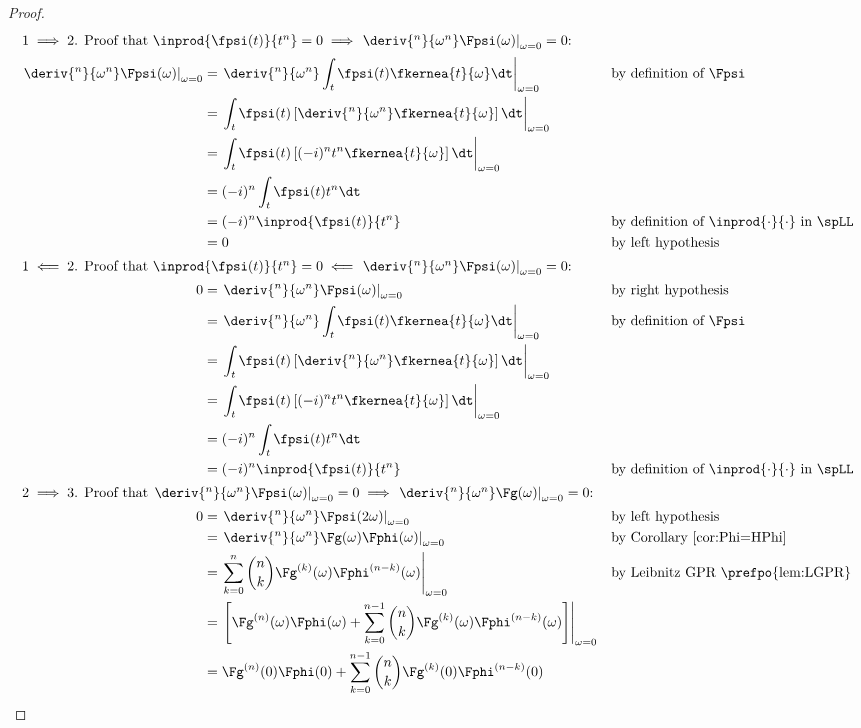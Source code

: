 \begin{proof}
\begin{align*}
  \intertext{$1\implies2$. Proof that $\inprod{\fpsi(t)}{t^n}=0 \implies \left.\deriv{^n}{\omega^n} \Fpsi(\omega)\right|_{\omega=0}=0$:}
    \left.\deriv{^n}{\omega^n} \Fpsi(\omega)\right|_{\omega=0}
      &= \left.\deriv{^n}{\omega^n} \int_t \fpsi(t) \fkernea{t}{\omega}\dt \right|_{\omega=0}
      && \text{by definition of $\Fpsi$}
    \\&= \left.\int_t \fpsi(t) \left[\deriv{^n}{\omega^n} \fkernea{t}{\omega}\right]\dt \right|_{\omega=0}
    \\&= \left.\int_t \fpsi(t) \left[(-i)^n t^n \fkernea{t}{\omega}\right]\dt \right|_{\omega=0}
    \\&= (-i)^n \int_t \fpsi(t) t^n \dt
    \\&= (-i)^n \inprod{\fpsi(t)}{t^n}
      && \text{by definition of $\inprod{\cdot}{\cdot}$ in $\spLL$}
    \\&= 0
      && \text{by left hypothesis}
  \\
  \intertext{$1\impliedby2$. Proof that $\inprod{\fpsi(t)}{t^n}=0 \impliedby \left.\deriv{^n}{\omega^n} \Fpsi(\omega)\right|_{\omega=0}=0$:}
    0
      &= \left. \deriv{^n}{\omega^n} \Fpsi(\omega)\right|_{\omega=0}
      && \text{by right hypothesis}
    \\&= \left.\deriv{^n}{\omega^n} \int_t \fpsi(t) \fkernea{t}{\omega}\dt \right|_{\omega=0}
      && \text{by definition of $\Fpsi$}
    \\&= \left.\int_t \fpsi(t) \left[\deriv{^n}{\omega^n} \fkernea{t}{\omega}\right]\dt \right|_{\omega=0}
    \\&= \left.\int_t \fpsi(t) \left[(-i)^n t^n \fkernea{t}{\omega}\right]\dt \right|_{\omega=0}
    \\&= (-i)^n \int_t \fpsi(t) t^n \dt
    \\&= (-i)^n \inprod{\fpsi(t)}{t^n}
      && \text{by definition of $\inprod{\cdot}{\cdot}$ in $\spLL$}
\\
\intertext{$2\implies3$. Proof that
  $\left.\deriv{^n}{\omega^n} \Fpsi(\omega)\right|_{\omega=0}=0 \implies \left.\deriv{^n}{\omega^n} \Fg(\omega)\right|_{\omega=0}=0$:
  }
    0
      &= \left.\deriv{^n}{\omega^n} \Fpsi(2\omega)\right|_{\omega=0}
      && \text{by left hypothesis}
    \\&= \left.\deriv{^n}{\omega^n} \Fg(\omega)\Fphi(\omega)\right|_{\omega=0}
      && \text{by Corollary~\ref{cor:Phi=HPhi}}
    \\&= \left.\sum_{k=0}^n {n \choose k} \Fg^{(k)}(\omega)\Fphi^{(n-k)}(\omega)\right|_{\omega=0}
      && \text{by Leibnitz GPR \prefpo{lem:LGPR}}
    \\&= \left.\left[
         \Fg^{(n)}(\omega)\Fphi(\omega)
         +\sum_{k=0}^{n-1} {n \choose k} \Fg^{(k)}(\omega)\Fphi^{(n-k)}(\omega)
         \right]\right|_{\omega=0}
    \\&= \Fg^{(n)}(0) \Fphi(0)
         +\sum_{k=0}^{n-1} {n \choose k} \Fg^{(k)}(0)\Fphi^{(n-k)}(0)
\end{align*}



\end{proof}
